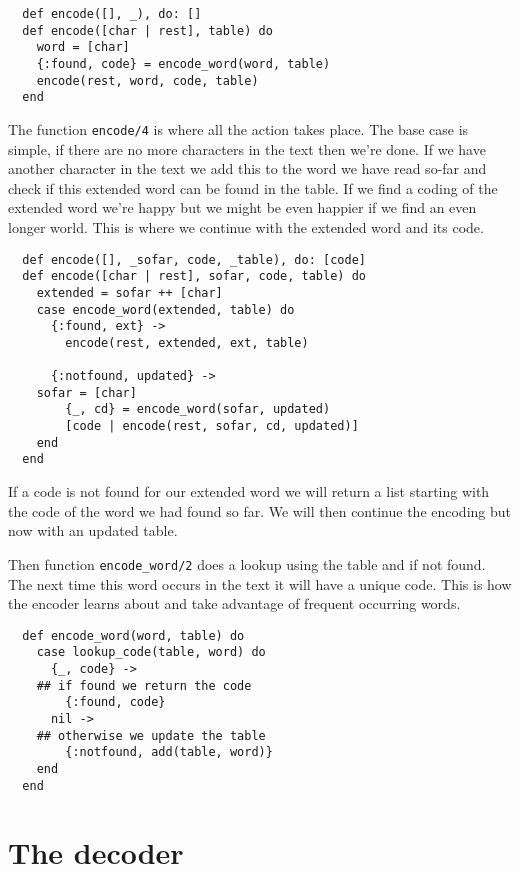 \documentclass[a4paper,11pt]{article}
\begin{document}
\begin{verbatim}
  def encode([], _), do: []
  def encode([char | rest], table) do
    word = [char]
    {:found, code} = encode_word(word, table)
    encode(rest, word, code, table)
  end
\end{verbatim}

The function {\tt encode/4} is where all the action takes place. The
base case is simple, if there are no more characters in the text then
we're done. If we have another character in the text we add this to the
word we have read so-far and check if this extended word can be found
in the table. If we find a coding of the extended word we're happy but we
might be even happier if we find an even longer world. This is
where we continue with the extended word and its code.

\begin{verbatim}
  def encode([], _sofar, code, _table), do: [code]
  def encode([char | rest], sofar, code, table) do
    extended = sofar ++ [char]
    case encode_word(extended, table) do
      {:found, ext} ->
        encode(rest, extended, ext, table)

      {:notfound, updated} ->
	sofar = [char]
        {_, cd} = encode_word(sofar, updated)
        [code | encode(rest, sofar, cd, updated)]
    end
  end
\end{verbatim}

If a code is not found for our extended word we will return a list
starting with the code of the word we had found so far. We will then
continue the encoding but now with an updated table. 

Then function {\tt encode\_word/2} does a lookup using the table and if
not found. The next time this word occurs in the text it will have a
unique code. This is how the encoder learns about and take advantage
of frequent occurring words.

\begin{verbatim}
  def encode_word(word, table) do
    case lookup_code(table, word) do
      {_, code} ->
	## if found we return the code
        {:found, code}
      nil ->
	## otherwise we update the table
        {:notfound, add(table, word)}
    end
  end
\end{verbatim}


\section{The decoder}
\end{document}
